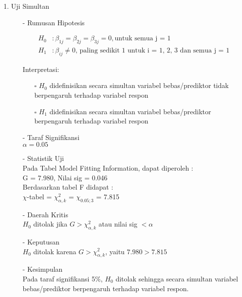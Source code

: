 \begin{enumerate}
    \def\labelenumi{\arabic{enumi}.}
    \tightlist
    \item Uji Simultan
    \begin{test}{
    \begin{enumerate}
        \item[-] Rumusan Hipotesis 
        \begin{fleqn}[\parindent]
            \begin{align*}
            H_0 &: \beta_{1j} = \beta_{2j} = \beta_{3j} = 0,  \text{untuk semua j = 1}\\ 
            H_1 &: \beta_{ij} \neq 0 \text{, paling sedikit 1 untuk i = 1, 2, 3 dan semua j = 1}
            \end{align*}
        \end{fleqn}
        Interpretasi:
        \begin{enumerate}
        \item[$\square$] $H_0$ didefinisikan secara simultan variabel bebas/prediktor tidak berpengaruh terhadap variabel respon
        \item[$\square$] $H_1$ didefinisikan secara simultan variabel bebas/prediktor berpengaruh terhadap variabel respon
        \end{enumerate}
    
        \item[-] Taraf Signifikansi \\
        $\alpha = 0.05$
    
        \item[-] Statistik Uji \\
        Pada Tabel Model Fitting Information, dapat diperoleh : \\
        G = 7.980, Nilai sig = 0.046 \\
        Berdasarkan tabel F didapat : \\
        $\chi$-tabel = $\chi_{\alpha, k}^2$ = $\chi_{0.05; 3}$ = 7.815
    
        \item[-] Daerah Kritis \\
        $H_0$ ditolak jika $G > \chi_{\alpha, k}^2$ atau nilai sig $< \alpha$
    
        \item[-] Keputusan \\
        $H_0$ ditolak karena $G > \chi_{\alpha, k}^2$, yaitu $7.980 > 7.815$
    
        \item[-] Kesimpulan \\
        Pada taraf signifikansi 5\%, $H_0$ ditolak sehingga secara simultan variabel bebas/prediktor berpengaruh terhadap variabel respon. 
    \end{enumerate}
    }
    \end{test}
    

\end{enumerate}
